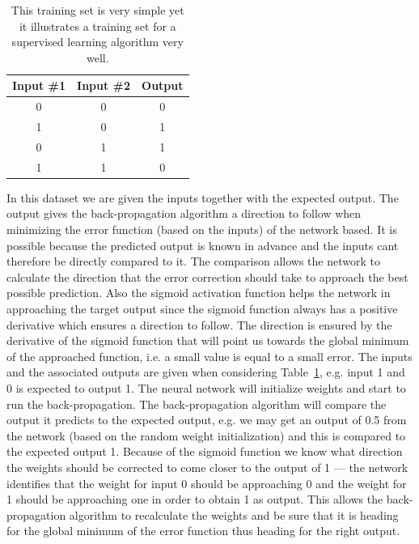 \begin{table}[H]
\centering  %
\begin{tabular}{c c c} %
Input \#1 & Input \#2 & Output \\ [0.5ex] %
\hline                  %
0 & 0 & 0  \\ %
1 & 0 & 1  \\
0 & 1 & 1  \\
1 & 1 & 0 \\ [1ex] %
\hline %
\end{tabular}
\caption{This training set is very simple yet it illustrates a training set for a supervised learning algorithm very well.} %
\label{table:xor-table} %
\end{table}

In this dataset we are given the inputs together with the expected output. The output gives the back-propagation algorithm a direction to follow when minimizing the error function (based on the inputs) of the network based. It is possible because the predicted output is known in advance and the inputs cant therefore be directly compared to it. The comparison allows the network to calculate the direction that the error correction should take to approach the best possible prediction. Also the sigmoid activation function helps the network in approaching the target output since the sigmoid function always has a positive derivative which ensures a direction to follow\cite[p. 153]{rojas1996neural}. The direction is ensured by the derivative of the sigmoid function that will point us towards the global minimum of the approached function, i.e. a small value is equal to a small error. The inputs and the associated outputs are given when considering Table~\ref{table:xor-table}, e.g. input 1 and 0 is expected to output 1. The neural network will initialize weights and start to run the back-propagation. The back-propagation algorithm will compare the output it predicts to the expected output, e.g. we may get an output of 0.5 from the network (based on the random weight initialization) and this is compared to the expected output 1. Because of the sigmoid function we know what direction the weights should be corrected to come closer to the output of 1 --- the network identifies that the weight for input 0 should be approaching 0 and the weight for 1 should be approaching one in order to obtain 1 as output. This allows the back-propagation algorithm to recalculate the weights and be sure that it is heading for the global minimum of the error function thus heading for the right output.

